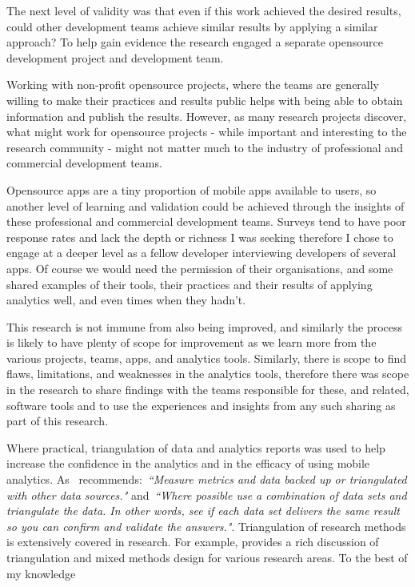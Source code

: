 The next level of validity was that even if this work achieved the desired results, could other development teams achieve similar results by applying a similar approach? To help gain evidence the research engaged a separate opensource development project and development team. 

Working with non-profit opensource projects, where the teams are generally willing to make their practices and results public helps with being able to obtain information and publish the results. However, as many research projects discover, what might work for opensource projects - while important and interesting to the research community - might not matter much to the industry of professional and commercial development teams. 

Opensource apps are a tiny proportion of mobile apps available to users, so another level of learning and validation could be achieved through the insights of these professional and commercial development teams. Surveys tend to have poor response rates and lack the depth or richness I was seeking therefore I chose to engage at a deeper level as a fellow developer interviewing developers of several apps. Of course we would need the permission of their organisations, and some shared examples of their tools, their practices and their results of applying analytics well, and even times when they hadn't.

This research is not immune from also being improved, and similarly the process is likely to have plenty of scope for improvement as we learn more from the various projects, teams, apps, and analytics tools. Similarly, there is scope to find flaws, limitations, and weaknesses in the analytics tools, therefore there was scope in the research to share findings with the teams responsible for these, and related, software tools and to use the experiences and insights from any such sharing as part of this research.

Where practical, triangulation of data and analytics reports was used to help increase the confidence in the analytics and in the efficacy of using mobile analytics. As~\citep{marr2015bigdatabook} recommends:~\emph{``Measure metrics and data backed up or triangulated with other data sources."} and~\emph{``Where possible use a combination of data sets and triangulate the data. In other words, see if each data set delivers the same result so you can confirm and validate the answers."}. Triangulation of research methods is extensively covered in research. For example, \citep{fielding2012_triangulation_and_mixed_methods_designs} provides a rich discussion of triangulation and mixed methods design for various research areas. To the best of my knowledge  %
